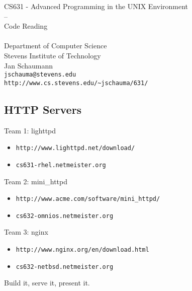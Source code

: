 \documentclass[xga]{xdvislides}
\begin{document}
\setfontphv

\lhead{\slidetitle}
\cfoot{\relax}
\rfoot{\Gray{\today}}

\vspace*{\fill}
\begin{center}
	\Hugesize
		CS631 - Advanced Programming in the UNIX Environment\\
		-- \\
		Code Reading\\
	\hspace*{5mm}\blueline\\ [1em]
	\Normalsize
		Department of Computer Science\\
		Stevens Institute of Technology\\
		Jan Schaumann\\
		\verb+jschauma@stevens.edu+\\
		\verb+http://www.cs.stevens.edu/~jschauma/631/+
\end{center}
\vspace*{\fill}

\subsection{HTTP Servers}

Team 1: lighttpd
\begin{itemize}
	\item {\tt http://www.lighttpd.net/download/}
	\item {\tt cs631-rhel.netmeister.org}
\end{itemize}

Team 2: mini\_httpd
\begin{itemize}
	\item {\tt http://www.acme.com/software/mini\_httpd/}
	\item {\tt cs632-omnios.netmeister.org}
\end{itemize}

Team 3: nginx
\begin{itemize}
	\item {\tt http://www.nginx.org/en/download.html}
	\item {\tt cs632-netbsd.netmeister.org}
\end{itemize}
\vspace{.5in}
Build it, serve it, present it.
\end{document}
